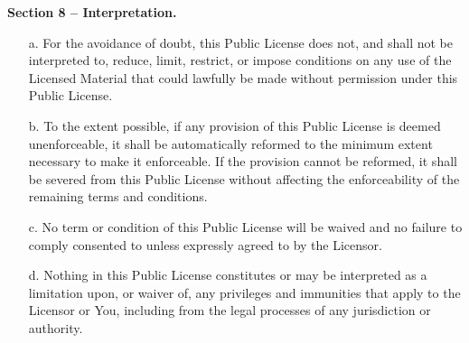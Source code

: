 \begin{center}
    \textbf{Section 8 -- Interpretation.}
\end{center}

\begin{itemize}
    \item[a.] For the avoidance of doubt, this Public License does not, and shall not be interpreted to, reduce, limit, restrict, or impose conditions on any use of the Licensed Material that could lawfully be made without permission under this Public License.

    \item[b.] To the extent possible, if any provision of this Public License is deemed unenforceable, it shall be automatically reformed to the minimum extent necessary to make it enforceable. If the provision cannot be reformed, it shall be severed from this Public License without affecting the enforceability of the remaining terms and conditions.

    \item[c.] No term or condition of this Public License will be waived and no failure to comply consented to unless expressly agreed to by the Licensor.

    \item[d.] Nothing in this Public License constitutes or may be interpreted as a limitation upon, or waiver of, any privileges and immunities that apply to the Licensor or You, including from the legal processes of any jurisdiction or authority.
\end{itemize}


